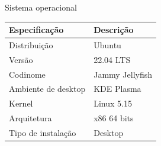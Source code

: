 \begin{frame}{Sistema operacional}
    \centering
    \begin{table}[h]
        \centering
        \begin{tabular}{l|l}
            \textbf{Especificação} & \textbf{Descrição} \\
            \toprule
            Distribuição & Ubuntu \\
            \hline
            Versão & 22.04 LTS  \\
            \hline
            Codinome & Jammy Jellyfish \\
            \hline
            Ambiente de desktop & KDE Plasma \\
            \hline
            Kernel & Linux 5.15 \\
            \hline
            Arquitetura & x86 64 bits \\
            \hline
            Tipo de instalação & Desktop\\
        \end{tabular}
    \end{table}
\end{frame}

